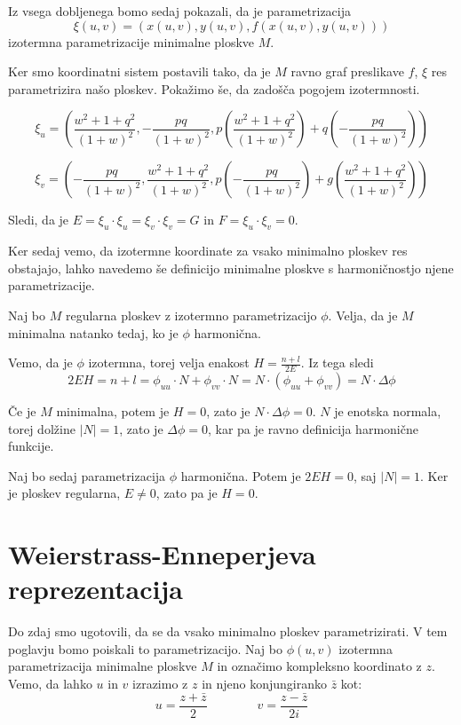 \documentclass[mat1]{fmfdelo}
\begin{document}
\begin{dokaz}
    Iz vsega dobljenega bomo sedaj pokazali, da je parametrizacija 
    $$ \xi (u, v) = \left( x(u,v), y(u, v), f(x(u, v), y(u, v)) \right) $$
    izotermna parametrizacije minimalne ploskve $M$. 

    Ker smo koordinatni sistem postavili tako, da je $M$ ravno graf preslikave $f$, 
    $\xi$ res parametrizira našo ploskev. Pokažimo še, da zadošča pogojem izotermnosti.

    $$ \xi_u = \left( \frac{w^2 + 1 + q^2}{(1 + w)^2} , - \frac{pq}{(1 + w)^2} , 
    p \left( \frac{w^2 + 1 + q^2}{(1 + w)^2} \right) + q \left( - \frac{pq}{(1 + w)^2} \right) \right) $$

    $$ \xi_v = \left( - \frac{pq}{(1 + w)^2} , \frac{w^2 + 1 + q^2}{(1 + w)^2} , 
    p \left( - \frac{pq}{(1 + w)^2} \right) + g \left( \frac{w^2 + 1 + q^2}{(1 + w)^2} \right)\right) $$

    Sledi, da je $E = \xi_u \cdot \xi_u = \xi_v \cdot \xi_v = G$ in $F = \xi_u \cdot \xi_v = 0$.
\end{dokaz}

Ker sedaj vemo, da izotermne koordinate za vsako minimalno ploskev res obstajajo, lahko navedemo 
še definicijo minimalne ploskve s harmoničnostjo njene parametrizacije.

\begin{trditev}
    Naj bo $M$ regularna ploskev z izotermno parametrizacijo $\phi$. 
    Velja, da je $M$ minimalna natanko tedaj, ko je $\phi$ harmonična.
\end{trditev}

\begin{dokaz}
    Vemo, da je $\phi$ izotermna, torej velja enakost $H = \frac{n + l}{2E}$. 
    Iz tega sledi 
    $$ 2 E H = n + l = \phi_{uu} \cdot N + \phi_{vv} \cdot N = N \cdot \left( \phi_{uu} + \phi_{vv} \right) = N \cdot \Delta \phi $$

    Če je $M$ minimalna, potem je $H = 0$, zato je $N \cdot \Delta \phi = 0$.
    $N$ je enotska normala, torej dolžine $\left\lvert N \right\rvert  = 1$, zato je $\Delta \phi = 0$,
    kar pa je ravno definicija harmonične funkcije.

    Naj bo sedaj parametrizacija $\phi$ harmonična. Potem je $2 E H = 0$, saj $\left\lvert N \right\rvert  = 1$.
    Ker je ploskev regularna, $E \neq 0$, zato pa je $H = 0$.
\end{dokaz}


\section{Weierstrass-Enneperjeva reprezentacija}
Do zdaj smo ugotovili, da se da vsako minimalno ploskev parametrizirati. V tem poglavju bomo poiskali to parametrizacijo.
Naj bo $\phi (u, v)$ izotermna parametrizacija minimalne ploskve $M$ in označimo kompleksno koordinato z $z$.
Vemo, da lahko $u$ in $v$ izrazimo z $z$ in njeno konjungiranko $\bar{z}$ kot:
$$ u = \frac{z + \bar{z}}{2} \qquad\qquad v = \frac{z - \bar{z}}{2i} $$
\end{document}

